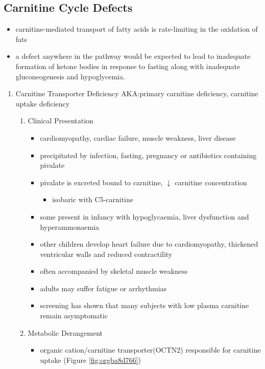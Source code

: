 \documentclass{scrartcl}
\begin{document}
\subsection{Carnitine Cycle Defects}
\label{sec:orgfe28065}
\begin{itemize}
\item carnitine-mediated transport of fatty acids is rate-limiting in the
oxidation of fats
\item a defect anywhere in the pathway would be expected to lead to
inadequate formation of ketone bodies in response to fasting along
with inadequate gluconeogenesis and hypoglycemia.
\end{itemize}
\begin{enumerate}
\item Carnitine Transporter Deficiency
\label{sec:org1facd3d}
AKA:primary carnitine deficiency, carnitine uptake deficiency
\begin{enumerate}
\item Clinical Presentation
\label{sec:org3428102}
\begin{itemize}
\item cardiomyopathy, cardiac failure, muscle weakness, liver disease
\item precipitated by infection, fasting, pregnancy or antibiotics containing pivalate
\item pivalate is excreted bound to carnitine, \(\downarrow\) carnitine concentration
\begin{itemize}
\item isobaric with C5-carnitine
\end{itemize}
\item some present in infancy with hypoglycaemia, liver dysfunction and hyperammonaemia
\item other children develop heart failure due to cardiomyopathy,
thickened ventricular walls and reduced contractility
\item often accompanied by skeletal muscle weakness
\item adults may suffer fatigue or arrhythmias
\item screening has shown that many subjects with low plasma carnitine remain asymptomatic
\end{itemize}
\item Metabolic Derangement
\label{sec:org45fef6c}
\begin{itemize}
\item organic cation/carnitine transporter(OCTN2) responsible for
carnitine uptake (Figure \ref{fig:orgba8d766})

\end{itemize}
\end{enumerate}
\end{enumerate}
\end{document}
